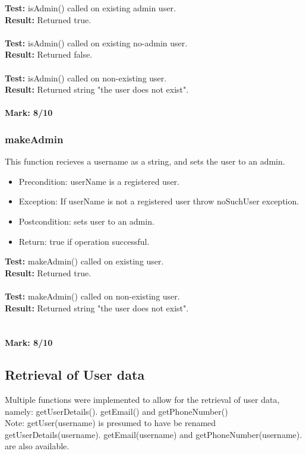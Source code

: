 \documentclass[12pt]{article}
\begin{document}
			\noindent \textbf{Test:} isAdmin() called on existing admin user.\\
			\textbf{Result:} Returned true.\\\\
			\textbf{Test:} isAdmin() called on existing no-admin user.\\
			\textbf{Result:} Returned false.\\\\
			\textbf{Test:} isAdmin() called on non-existing user.\\
			\textbf{Result:} Returned string "the user does not exist".\\ \\
			\textbf{Mark: 8/10}
	
	\pagebreak
		\subsubsection{makeAdmin}
			This function recieves a username as a string, and sets the user to an admin.
		
		\begin{itemize}
			\item Precondition: userName is a registered user.
			\item Exception: If userName is not a registered user throw noSuchUser exception.
			\item Postcondition: sets user to an admin.
			\item Return: true if operation successful.
		\end{itemize}
			
		\noindent \textbf{Test:} makeAdmin() called on existing user.\\
		\textbf{Result:} Returned true.\\\\
		\textbf{Test:} makeAdmin() called on non-existing user.\\
		\textbf{Result:} Returned string "the user does not exist".\\
		\\ \\
		\textbf{Mark: 8/10}

\pagebreak	
	\subsection{Retrieval of User data}
	Multiple functions were implemented to allow for the retrieval of user data, namely: getUserDetails(). getEmail() and getPhoneNumber()\\
	\indent * Note: getUser(username) is presumed to have be renamed getUserDetails(username). getEmail(username) and getPhoneNumber(username). are also available.
	
\end{document}
